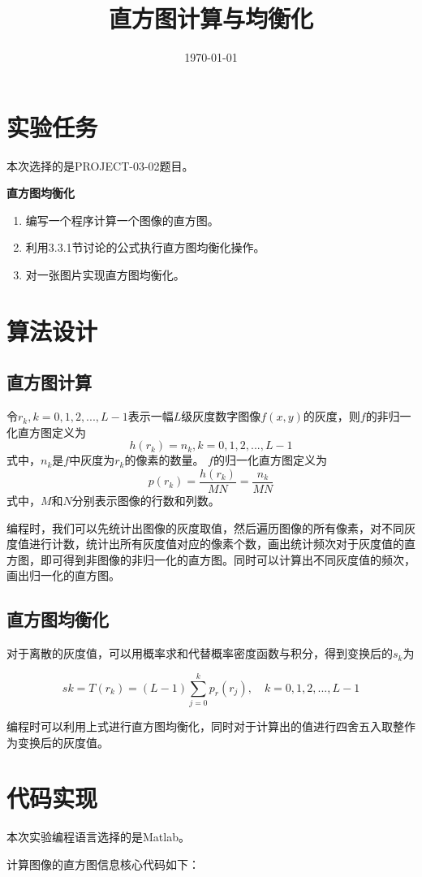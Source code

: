 \documentclass{../source/Experiment}
\title{直方图计算与均衡化}
\date{\today}
\begin{document}
    \makecover
    \section{实验任务}
        本次选择的是PROJECT-03-02题目。
        
        \bfseries{直方图均衡化}

        \begin{enumerate}
            \item 编写一个程序计算一个图像的直方图。
            \item 利用3.3.1节讨论的公式执行直方图均衡化操作。
            \item 对一张图片实现直方图均衡化。
        \end{enumerate}
    \section{算法设计}
        \subsection{直方图计算}
        令$r_k, k = 0,1,2,...,L-1 $表示一幅$L$级灰度数字图像$f(x,y)$的灰度，则$f$的非归一化直方图定义为
        $$h(r_k) = n_k, k = 0,1,2,...,L-1$$
        式中，$n_k$是$f$中灰度为$r_k$的像素的数量。
        $f$的归一化直方图定义为
        $$p(r_k) = \frac{h(r_k)}{MN} = \frac{n_k}{MN}$$
        式中，$M$和$N$分别表示图像的行数和列数。

        编程时，我们可以先统计出图像的灰度取值，然后遍历图像的所有像素，对不同灰度值进行计数，统计出所有灰度值对应的像素个数，画出统计频次对于灰度值的直方图，即可得到非图像的非归一化的直方图。同时可以计算出不同灰度值的频次，画出归一化的直方图。
        \subsection{直方图均衡化}
        对于离散的灰度值，可以用概率求和代替概率密度函数与积分，得到变换后的$s_k$为

        $$sk = T(r_k) = (L - 1)\sum^k_{j = 0}p_r(r_j), \quad k = 0,1,2,...,L-1$$

        编程时可以利用上式进行直方图均衡化，同时对于计算出的值进行四舍五入取整作为变换后的灰度值。
    \section{代码实现}
        本次实验编程语言选择的是Matlab。

        计算图像的直方图信息核心代码如下：
\end{document}
